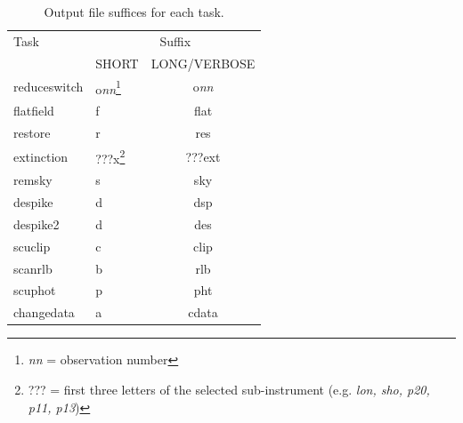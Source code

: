 \documentclass[twoside,11pt]{article}
\newcommand{\task}[1]{{\sf #1}}
\newcommand{\chgdata}{\htmlref{\task{change\_data}}{CHANGE_DATA}}
\newcommand{\resw}{\htmlref{\task{reduce\_switch}}{REDUCE_SWITCH}}
\newcommand{\flatf}{\htmlref{\task{flatfield}}{FLATFIELD}}
\newcommand{\scuphot}{\htmlref{\task{scuphot}}{SCUPHOT}}
\newcommand{\ext}{\htmlref{\task{extinction}}{EXTINCTION}}
\newcommand{\remsky}{\htmlref{\task{remsky}}{REMSKY}}
\newcommand{\restore}{\htmlref{\task{restore}}{RESTORE}}
\newcommand{\despike}{\htmlref{\task{despike}}{DESPIKE}}
\newcommand{\despikeb}{\htmlref{\task{despike2}}{DESPIKE2}}
\newcommand{\scuclip}{\htmlref{\task{scuclip}}{SCUCLIP}}
\newcommand{\scanrlb}{\htmlref{\task{scan\_rlb}}{SCAN_RLB}}
\newcommand{\htmlref}[2]{#1}
\renewcommand{\_}{\texttt{\symbol{95}}}
\begin{document}
\begin{table}
\begin{minipage}{\textwidth}
\caption{Output file suffices for each task.}
\label{tab_suffices}
\begin{center}
\begin{tabular}{llc}
\hline\hline
Task & \multicolumn{2}{c}{Suffix} \\ \cline{2-3} 
     & SHORT & LONG/VERBOSE  \\ \hline

\resw   & o\textit{nn}\footnote{\textit{nn} = observation number} & o\textit{nn} \\
\flatf  & f   & \_flat \\
\restore& r   & \_res  \\
\ext    & \_???\_x\footnote{??? = first three letters of the selected
sub-instrument (e.g. \textit{lon, sho, p20, p11, p13})} & \_???\_ext\\
\remsky & s   & \_sky \\
\despike & d  & \_dsp \\
\despikeb & d & \_des \\
\scuclip & c & \_clip \\
\scanrlb & b & \_rlb \\
\scuphot & p & \_pht \\
\chgdata & a  & \_cdata \\

\hline\hline
\end{tabular}
\end{center}
\end{minipage}
\end{table}
\end{document}
